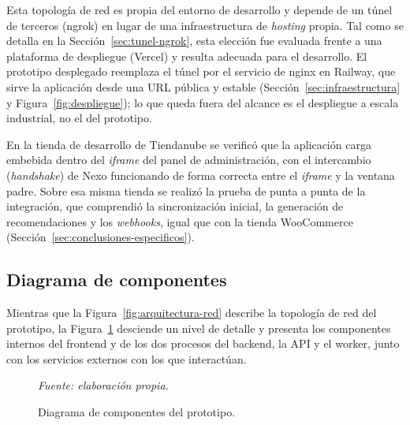 Esta topología de red es propia del entorno de desarrollo y depende de un túnel de terceros (ngrok) en lugar de una infraestructura de \emph{hosting} propia. Tal como se detalla en la Sección~\ref{sec:tunel-ngrok}, esta elección fue evaluada frente a una plataforma de despliegue (Vercel) y resulta adecuada para el desarrollo. El prototipo desplegado reemplaza el túnel por el servicio de nginx en Railway, que sirve la aplicación desde una URL pública y estable (Sección~\ref{sec:infraestructura} y Figura~\ref{fig:despliegue}); lo que queda fuera del alcance es el despliegue a escala industrial, no el del prototipo.

En la tienda de desarrollo de Tiendanube se verificó que la aplicación carga embebida dentro del \emph{iframe} del panel de administración, con el intercambio (\emph{handshake}) de Nexo funcionando de forma correcta entre el \emph{iframe} y la ventana padre. Sobre esa misma tienda se realizó la prueba de punta a punta de la integración, que comprendió la sincronización inicial, la generación de recomendaciones y los \emph{webhooks}, igual que con la tienda WooCommerce (Sección~\ref{sec:conclusiones-especificos}).

\subsection{Diagrama de componentes}
\label{sec:diagrama-componentes}

Mientras que la Figura~\ref{fig:arquitectura-red} describe la topología de red del prototipo, la Figura~\ref{fig:comp-diagram} desciende un nivel de detalle y presenta los componentes internos del frontend y de los dos procesos del backend, la API y el worker, junto con los servicios externos con los que interactúan.

\begin{figure}[!htbp]
    \centering
    
    \caption{Diagrama de componentes del prototipo.}
    \label{fig:comp-diagram}
\smallskip
\noindent\textit{Fuente: elaboración propia.}
\end{figure}

